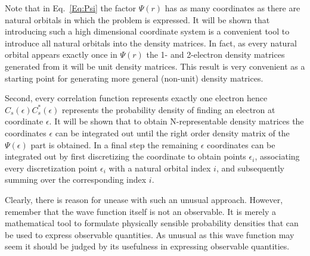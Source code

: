 \documentclass[pra,nofootinbib]{revtex4-1}
\begin{document}
Note that in Eq.~\ref{Eq:Psi} the factor $\Psi(r)$ has as many coordinates as there 
are natural orbitals in which the problem is expressed. 
It will be shown that introducing such a high dimensional coordinate
system is a convenient tool to introduce all natural orbitals into the density matrices.
In fact, as every natural orbital appears exactly once in $\Psi(r)$ the 1- and 2-electron 
density matrices generated from it will be unit density matrices. This result is very convenient
as a starting point for generating more general (non-unit) density matrices.

Second, every correlation function represents exactly one electron hence $C_s(\epsilon)C^*_s(\epsilon)$
represents the probability density of finding an electron at coordinate $\epsilon$.
It will be shown that to obtain N-representable density
matrices the coordinates $\epsilon$ can be integrated out until the right order density matrix of 
the $\Psi(\epsilon)$ part is obtained. In a final step the remaining $\epsilon$ coordinates can be integrated
out by first discretizing the coordinate to obtain points $\epsilon_i$, associating every discretization
point $\epsilon_i$ with a natural orbital index $i$, and subsequently summing over the corresponding
index $i$.

Clearly, there is reason for unease with such an unusual approach. However, remember that the 
wave function itself is not an observable. It is merely a mathematical tool to formulate 
physically sensible probability densities that can be used to express observable quantities.
As unusual as this wave function may seem it should be judged by its usefulness in 
expressing observable quantities.
\end{document}
